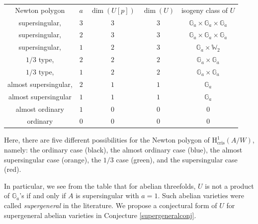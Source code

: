 \documentclass[a4paper,12pt,twoside]{report}
\newcommand{\G}{\mathbb{G}}
\newcommand{\cris}{\mathrm{cris}}
\newcommand{\HH}{\mathrm{H}}
\newcommand{\W}{\mathbb{W}}
\begin{document}
\begin{center}{\rm
    \begin{tabular}{ c|c|c|c|c }
    Newton polygon &    $a$      & $\dim(U[p])$& $\dim(U)$ & isogeny class of $U$\\ 
    supersingular, &    $3$      &  $3$       & $3$      & $\G_a\times \G_a\times \G_a$  \\ 
    supersingular, &    $2$      &  $3$       & $3$     & $\G_a\times \G_a\times \G_a$\\    
    supersingular, &    $1$      &  $2$       & $3$     & $\G_a\times \W_2$\\            
    $1/3$ type,    &    $2$      &  $2$       & $2$     & $\G_a\times \G_a$  \\ 
    $1/3$ type,    &    $1$      &  $2$       & $2$     & $\G_a\times \G_a$\\                 
    almost supersingular,& $2$   &  $1$       & $1$     & $\G_a$  \\ 
    almost supersingular & $1$   &  $1$       & $1$     & $\G_a$\\           
     almost ordinary   & $1$     &  $0$       & $0$     & $0$  \\ 
     ordinary      &    $0$      &  $0$       & $0$     & $0$\\           
    \end{tabular}}
\end{center}

Here, there are five different possibilities for the Newton polygon of $\HH^1_{\cris}(A/W)$, 
namely: the ordinary case (black), the almost ordinary case (blue), the almost supersingular case (orange), the $1/3$ case (green), and the supersingular case (red). 
\begin{center}
\end{center}

In particular, we see from the table that for abelian threefolds, $U$ is not a product of $\G_a$'s if and only if $A$ is supersingular with $a=1$. 
Such abelian varieties were called \emph{supergeneral} in the literature. 
We propose a conjectural form of $U$ for supergeneral abelian varieties in Conjecture \ref{supergeneralconj}. 
\end{document}

